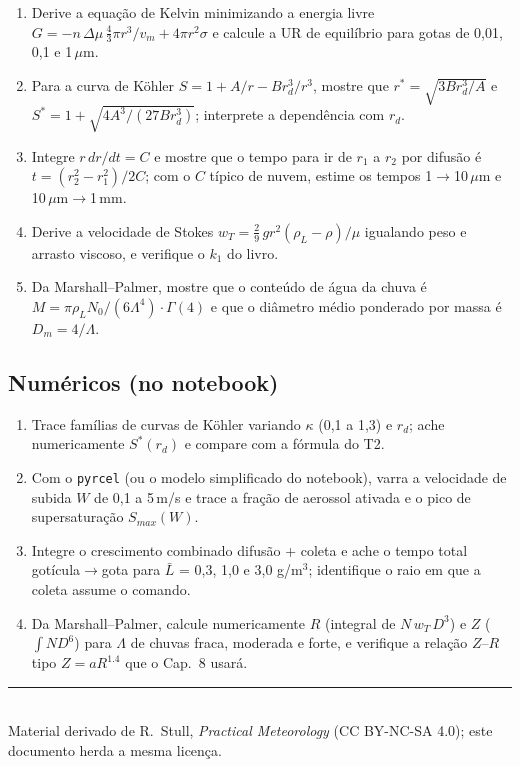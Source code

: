 \documentclass[11pt]{article}
\begin{document}
\begin{enumerate}[label=\textbf{T\arabic*.},itemsep=4pt]
  \item Derive a equação de Kelvin minimizando a energia livre
        $G = -n\,\Delta\mu\,\tfrac43\pi r^3/v_m + 4\pi r^2\sigma$ e
        calcule a UR de equilíbrio para gotas de 0{,}01, 0{,}1 e
        1\,$\mu$m.
  \item Para a curva de Köhler $S = 1 + A/r - Br_d^3/r^3$, mostre que
        $r^* = \sqrt{3Br_d^3/A}$ e $S^* = 1 + \sqrt{4A^3/(27Br_d^3)}$;
        interprete a dependência com $r_d$.
  \item Integre $r\,dr/dt = C$ e mostre que o tempo para ir de $r_1$ a
        $r_2$ por difusão é $t = (r_2^2 - r_1^2)/2C$; com o $C$ típico
        de nuvem, estime os tempos 1$\to$10\,$\mu$m e
        10\,$\mu$m$\to$1\,mm.
  \item Derive a velocidade de Stokes
        $w_T = \tfrac{2}{9}\,g r^2(\rho_L-\rho)/\mu$ igualando peso e
        arrasto viscoso, e verifique o $k_1$ do livro.
  \item Da Marshall--Palmer, mostre que o conteúdo de água da chuva é
        $M = \pi\rho_L N_0/(6\Lambda^4)\cdot\Gamma(4)$ e que o diâmetro
        médio ponderado por massa é $D_m = 4/\Lambda$.
\end{enumerate}

\subsection*{Numéricos (no notebook)}

\begin{enumerate}[label=\textbf{N\arabic*.},itemsep=4pt]
  \item Trace famílias de curvas de Köhler variando $\kappa$ (0{,}1 a
        1{,}3) e $r_d$; ache numericamente $S^*(r_d)$ e compare com a
        fórmula do T2.
  \item Com o \texttt{pyrcel} (ou o modelo simplificado do notebook),
        varra a velocidade de subida $W$ de 0{,}1 a 5\,m/s e trace a
        fração de aerossol ativada e o pico de supersaturação
        $S_{max}(W)$.
  \item Integre o crescimento combinado difusão + coleta e ache o tempo
        total gotícula$\to$gota para $\bar L$ = 0{,}3, 1{,}0 e 3{,}0
        g/m$^3$; identifique o raio em que a coleta assume o comando.
  \item Da Marshall--Palmer, calcule numericamente $R$ (integral de
        $N\,w_T\,D^3$) e $Z$ ($\int N D^6$) para $\Lambda$ de chuvas
        fraca, moderada e forte, e verifique a relação $Z$--$R$ tipo
        $Z = a R^{1.4}$ que o Cap.~8 usará.
\end{enumerate}

\vspace{1em}
\noindent\rule{\linewidth}{0.4pt}\\
{\scriptsize Material derivado de R.~Stull, \emph{Practical Meteorology}
(CC BY-NC-SA 4.0); este documento herda a mesma licença.}
\end{document}
